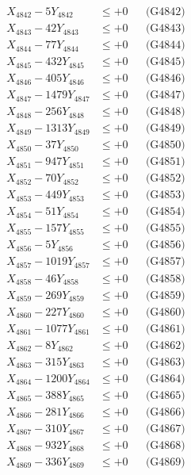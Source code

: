 \documentclass[a4paper,10pt]{article}
\begin{document}
{\begin{align}
X_{4842} - 5Y_{4842} &\leq +0 && \text{(G4842)} \\
X_{4843} - 42Y_{4843} &\leq +0 && \text{(G4843)} \\
X_{4844} - 77Y_{4844} &\leq +0 && \text{(G4844)} \\
X_{4845} - 432Y_{4845} &\leq +0 && \text{(G4845)} \\
X_{4846} - 405Y_{4846} &\leq +0 && \text{(G4846)} \\
X_{4847} - 1479Y_{4847} &\leq +0 && \text{(G4847)} \\
X_{4848} - 256Y_{4848} &\leq +0 && \text{(G4848)} \\
X_{4849} - 1313Y_{4849} &\leq +0 && \text{(G4849)} \\
X_{4850} - 37Y_{4850} &\leq +0 && \text{(G4850)} \\
\allowbreak
X_{4851} - 947Y_{4851} &\leq +0 && \text{(G4851)} \\
X_{4852} - 70Y_{4852} &\leq +0 && \text{(G4852)} \\
X_{4853} - 449Y_{4853} &\leq +0 && \text{(G4853)} \\
X_{4854} - 51Y_{4854} &\leq +0 && \text{(G4854)} \\
X_{4855} - 157Y_{4855} &\leq +0 && \text{(G4855)} \\
X_{4856} - 5Y_{4856} &\leq +0 && \text{(G4856)} \\
X_{4857} - 1019Y_{4857} &\leq +0 && \text{(G4857)} \\
X_{4858} - 46Y_{4858} &\leq +0 && \text{(G4858)} \\
X_{4859} - 269Y_{4859} &\leq +0 && \text{(G4859)} \\
X_{4860} - 227Y_{4860} &\leq +0 && \text{(G4860)} \\
\allowbreak
X_{4861} - 1077Y_{4861} &\leq +0 && \text{(G4861)} \\
X_{4862} - 8Y_{4862} &\leq +0 && \text{(G4862)} \\
X_{4863} - 315Y_{4863} &\leq +0 && \text{(G4863)} \\
X_{4864} - 1200Y_{4864} &\leq +0 && \text{(G4864)} \\
X_{4865} - 388Y_{4865} &\leq +0 && \text{(G4865)} \\
X_{4866} - 281Y_{4866} &\leq +0 && \text{(G4866)} \\
X_{4867} - 310Y_{4867} &\leq +0 && \text{(G4867)} \\
X_{4868} - 932Y_{4868} &\leq +0 && \text{(G4868)} \\
X_{4869} - 336Y_{4869} &\leq +0 && \text{(G4869)} \\

\end{align}}
\end{document}
